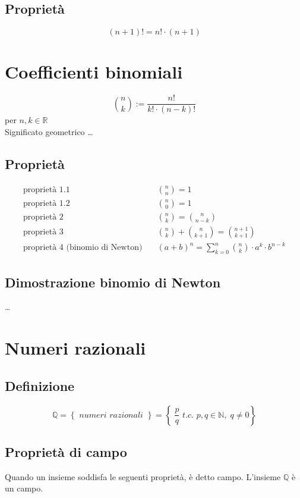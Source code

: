 \documentclass[a4paper]{article}
\begin{document}
\subsection{Proprietà}
\[(n + 1)! = n! \cdot (n + 1)\]

\section{Coefficienti binomiali}
\[\binom{n}{k} := \frac{n!}{k! \cdot (n - k)!}\]
per \(n, k \in \mathbb{R}\) \\
Significato geometrico \dots

\subsection{Proprietà}
\begin{align*}
	\text{proprietà 1.1} \quad & \binom{n}{n} = 1 \\
	\text{proprietà 1.2} \quad & \binom{n}{0} = 1 \\
	\text{proprietà 2} \quad & \binom{n}{k} = \binom{n}{n-k} \\
	\text{proprietà 3} \quad & \binom{n}{k} + \binom{n}{k+1} = \binom{n+1}{k+1} \\
	\text{proprietà 4 (binomio di Newton)} \quad & (a + b) ^ n = \sum_{k = 0} ^ {n} \binom{n}{k} \cdot a ^ k \cdot b ^ {n - k}
\end{align*}

\subsection{Dimostrazione binomio di Newton}
\dots

\newpage

\section{Numeri razionali}
\subsection{Definizione}
\[\mathbb{Q} = \left\{ \textit{ numeri razionali } \right\} = \left\{ \; \frac{p}{q} \textit{ t.c. } p,q \in \mathbb{N}, \; q \neq 0 \right\}\]

\subsection{Proprietà di campo}
Quando un insieme soddisfa le seguenti proprietà, è detto campo. L'insieme \(\mathbb{Q}\) è un campo.
\end{document}
